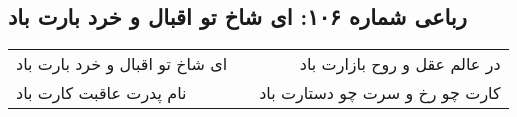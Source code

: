 \begin{center}
\section*{رباعی شماره ۱۰۶: ای شاخ تو اقبال و خرد بارت باد}
\label{sec:sh106}
\begin{longtable}{l p{0.5cm} r}
ای شاخ تو اقبال و خرد بارت باد
&&
در عالم عقل و روح بازارت باد
\\
نام پدرت عاقبت کارت باد
&&
کارت چو رخ و سرت چو دستارت باد
\\
\end{longtable}
\end{center}
